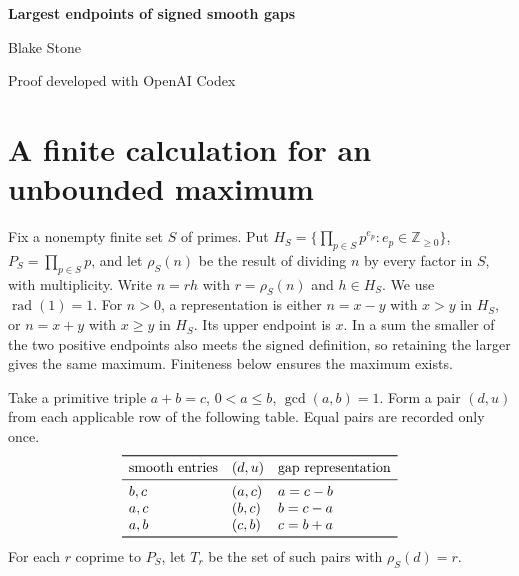 \documentclass[11pt,letterpaper]{article}
\newcommand{\Hs}{H_S}
\newcommand{\rad}{\operatorname{rad}}
\newcommand{\rough}{\rho_S}
\begin{document}
\begin{center}
{\LARGE\bfseries Largest endpoints of signed smooth gaps}\par\medskip
Blake Stone\par{\small Proof developed with OpenAI Codex}
\end{center}
\begin{abstract}
For a finite set of primes $S$, let $A_S(n)$ be the largest positive $S$-smooth integer $x$ for which $|x-n|$ is positive and $S$-smooth, with value zero if the set is empty. We give an exact formula in terms of primitive coprime sums. The complete tables of von K\"anel and Matschke then settle every displayed term and both first-shortfall assertions in OEIS A391077 and A376924, and give exact answers at infinitely many indices beyond the certified prefixes. For arbitrary $S$ we prove a joint distribution law for the sign and logarithmic size of the partner at the largest endpoint. Gaps with several representations form a finite union of translates under multiplication by $S$-smooth integers.
\end{abstract}

\section{A finite calculation for an unbounded maximum}
Fix a nonempty finite set $S$ of primes. Put
$\Hs=\{\prod_{p\in S}p^{e_p}:e_p\in\mathbb Z_{\ge0}\}$,
$P_S=\prod_{p\in S}p$, and let $\rough(n)$ be the result of dividing $n$ by every factor in $S$, with multiplicity. Write $n=rh$ with $r=\rough(n)$ and $h\in\Hs$. We use $\rad(1)=1$.
For $n>0$, a representation is either $n=x-y$ with $x>y$ in $\Hs$, or $n=x+y$ with $x\ge y$ in $\Hs$. Its upper endpoint is $x$. In a sum the smaller of the two positive endpoints also meets the signed definition, so retaining the larger gives the same maximum. Finiteness below ensures the maximum exists.

Take a primitive triple $a+b=c$, $0<a\le b$, $\gcd(a,b)=1$. Form a pair $(d,u)$ from each applicable row of the following table. Equal pairs are recorded only once.
\[
\begin{array}{lll}
\toprule
\text{smooth entries} & (d,u) & \text{gap representation}\\
\midrule
b,c &(a,c)&a=c-b\\
a,c &(b,c)&b=c-a\\
a,b &(c,b)&c=b+a\\
\bottomrule
\end{array}
\]
For each $r$ coprime to $P_S$, let $T_r$ be the set of such pairs with $\rough(d)=r$.
\end{document}
